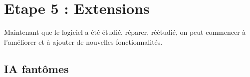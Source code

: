 \documentclass[12pt,a4paper,final]{article}
\begin{document}
\newpage
\section{Etape 5 : Extensions}\label{sec:etape5}

Maintenant que le logiciel a été étudié, réparer, réétudié, on peut commencer à l'améliorer et à ajouter de nouvelles fonctionnalités.
\subsection{IA fantômes} 
\end{document}
